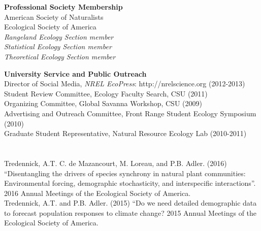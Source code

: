 \documentclass[margin,line]{resume}
\begin{document}
\begin{resume}
 \textbf{Professional Society Membership}\\
        American Society of Naturalists\\
    	Ecological Society of America\\
	\phantom{} \quad \emph{Rangeland Ecology Section member}\\
	\phantom{} \quad \emph{Statistical Ecology Section member}\\
	\phantom{} \quad \emph{Theoretical Ecology Section member}


   \textbf{University Service and Public Outreach}\\
   	Director of Social Media, \textsl{NREL EcoPress}: http://nrelscience.org (2012-2013)\\
	Student Review Committee, Ecology Faculty Search, CSU (2011)\\
	Organizing Committee, Global Savanna Workshop, CSU (2009)\\
	Advertising and Outreach Committee, Front Range Student Ecology Symposium (2010)\\
	Graduate Student Representative, Natural Resource Ecology Lab (2010-2011)
  
     \section{\textmd{\textsf{\color{MidnightBlue}{Presentations}}}}
        Tredennick, A.T. C. de Mazancourt, M. Loreau, and P.B. Adler. (2016) ``Disentangling the drivers of species synchrony in natural plant communities: Environmental forcing, demographic stochasticity, and interspecific interactions''. 2016 Annual Meetings of the Ecological Society of America.\vspace{-6mm}\\%
        
    Tredennick, A.T. and P.B. Adler. (2015) ``Do we need detailed demographic data to forecast population responses to climate change? 2015 Annual Meetings of the Ecological Society of America.\vspace{-6mm}\\%
    

\end{resume}
\end{document}
